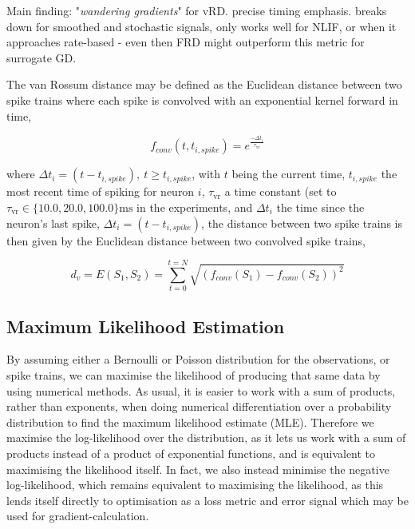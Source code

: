 \documentclass[mphil,deptreport,ianc]{infthesis} %
\begin{document}

Main finding: 
"\textit{wandering gradients}" for vRD.
precise timing emphasis. breaks down for smoothed and stochastic signals, only works well for NLIF, or when it approaches rate-based - even then FRD might outperform this metric for surrogate GD.

The van Rossum distance \cite{VanRossum2001} may be defined as the Euclidean distance between two spike trains where each spike is convolved with an exponential kernel forward in time,

\begin{equation}
    f_{conv}(t, t_{i, spike}) = e^{\frac{-\Delta t_i}{\tau_{\mathrm{vr}}}}
\end{equation}

where $\Delta t_i = (t-t_{i, spike}),\ t \geq t_{i,spike}$, 
with $t$ being the current time, $t_{i,spike}$ the most recent time of spiking for neuron $i$, $\tau_{\mathrm{vr}}$ a time constant (set to $\tau_{\mathrm{vr}} \in \{10.0, 20.0, 100.0\} \si{\ms}$ in the experiments, and $\Delta t_i$ the time since the neuron's last spike, $\Delta t_i = (t-t_{i, spike})$, the distance between two spike trains is then given by the Euclidean distance between two convolved spike trains,


\begin{equation}
    d_v = E(S_1, S_2) = \sum_{t=0}^{t=N} \sqrt{(f_{conv}(S_1)-f_{conv}(S_2))^2}
\end{equation}




\subsection{Maximum Likelihood Estimation}

By assuming either a Bernoulli or Poisson distribution for the observations, or spike trains, we can maximise the likelihood of producing that same data by using numerical methods.
As usual, it is easier to work with a sum of products, rather than exponents, when doing numerical differentiation over a probability distribution to find the maximum likelihood estimate (MLE).
Therefore we maximise the log-likelihood over the distribution, as it lets us work with a sum of products instead of a product of exponential functions, and is equivalent to maximising the likelihood itself.
In fact, we also instead minimise the negative log-likelihood, which remains equivalent to maximising the likelihood, as this lends itself directly to optimisation as a loss metric and error signal which may be used for gradient-calculation.
\end{document}
